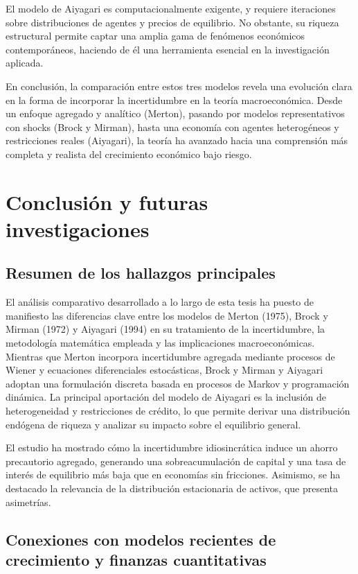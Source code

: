 \documentclass[a4paper,12pt]{article}
\begin{document}
El modelo de Aiyagari es computacionalmente exigente, y requiere iteraciones sobre distribuciones de agentes y precios de equilibrio. No obstante, su riqueza estructural permite captar una amplia gama de fenómenos económicos contemporáneos, haciendo de él una herramienta esencial en la investigación aplicada.

En conclusión, la comparación entre estos tres modelos revela una evolución clara en la forma de incorporar la incertidumbre en la teoría macroeconómica. Desde un enfoque agregado y analítico (Merton), pasando por modelos representativos con shocks (Brock y Mirman), hasta una economía con agentes heterogéneos y restricciones reales (Aiyagari), la teoría ha avanzado hacia una comprensión más completa y realista del crecimiento económico bajo riesgo.


\section{Conclusión y futuras investigaciones}

\subsection{Resumen de los hallazgos principales}

El análisis comparativo desarrollado a lo largo de esta tesis ha puesto de manifiesto las diferencias clave entre los modelos de Merton (1975), Brock y Mirman (1972) y Aiyagari (1994) en su tratamiento de la incertidumbre, la metodología matemática empleada y las implicaciones macroeconómicas. Mientras que Merton incorpora incertidumbre agregada mediante procesos de Wiener y ecuaciones diferenciales estocásticas, Brock y Mirman y Aiyagari adoptan una formulación discreta basada en procesos de Markov y programación dinámica. La principal aportación del modelo de Aiyagari es la inclusión de heterogeneidad y restricciones de crédito, lo que permite derivar una distribución endógena de riqueza y analizar su impacto sobre el equilibrio general.

El estudio ha mostrado cómo la incertidumbre idiosincrática induce un ahorro precautorio agregado, generando una sobreacumulación de capital y una tasa de interés de equilibrio más baja que en economías sin fricciones. Asimismo, se ha destacado la relevancia de la distribución estacionaria de activos, que presenta asimetrías.

\subsection{Conexiones con modelos recientes de crecimiento y finanzas cuantitativas}
\end{document}
